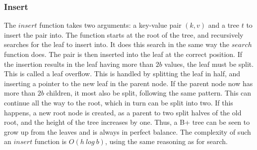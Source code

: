 \subsubsection{Insert}
The $insert$ function takes two arguments: a key-value pair $(k, v)$ and a tree $t$ to insert the pair into. The function starts at the root of the tree, and recursively searches for the leaf to insert into. It does this search in the same way the $search$ function does. The pair is then inserted into the leaf at the correct position. If the insertion results in the leaf having more than $2b$ values, the leaf must be split. This is called a leaf overflow. This is handled by splitting the leaf in half, and inserting a pointer to the new leaf in the parent node. If the parent node now has more than $2b$ children, it most also be split, following the same pattern. This can continue all the way to the root, which in turn can be split into two. If this happens, a new root node is created, as a parent to two split halves of the old root, and the height of the tree increases by one. Thus, a B+ tree can be seen to grow up from the leaves and is always in perfect balance. The complexity of such an $insert$ function is $O(h~log~b)$, using the same reasoning as for search.
